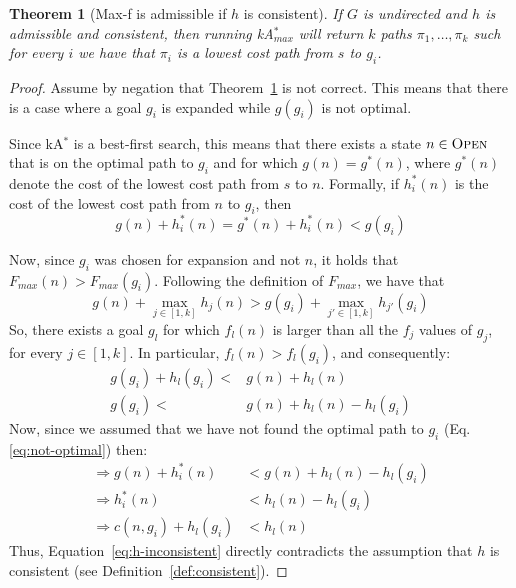 \documentclass{aicom2e}
\newtheorem{theorem}{Theorem}
\newcommand{\kastar}{kA$^*$}
\newcommand{\kastarmax}{kA$^*_{max}$}
\newcommand{\maxf}{Max-f}
\newcommand{\open}{\textsc{Open}}
\begin{document}
 
\begin{theorem}[\maxf{} is admissible if $h$ is consistent]
If $G$ is undirected and $h$ is admissible and consistent, 
then running \kastarmax{} will return $k$ paths $\pi_1,\ldots, \pi_k$ such for every $i$ we have that $\pi_i$ is a lowest cost path from $s$ to $g_i$. 
\label{the:max-f}
\end{theorem}
 \begin{proof}
 Assume by negation that Theorem~\ref{the:max-f} is not correct. This means
 that there is a case where a goal $g_i$ is expanded while $g(g_i)$ is not optimal. 
 
 Since \kastar{} is a best-first search, this means that there exists a state $n\in \open{}$ that is on the optimal path to $g_i$ and for which $g(n)=g^*(n)$, where $g^*(n)$ denote the cost of the lowest cost path from $s$ to $n$. Formally, 
 if $h^*_i(n)$ is the cost of the lowest cost path from $n$ to $g_i$, then
 \begin{equation}
     g(n)+h_i^*(n) = g^*(n)+h_i^*(n) < g(g_i)
    \label{eq:not-optimal}
 \end{equation}
 
 Now, since $g_i$ was chosen for expansion and not $n$, it holds that $F_{max}(n)  > F_{max}(g_i)$. Following the definition of $F_{max}$, we have that
 \begin{equation}
     g(n)+\max_{j\in [1,k]} h_j(n) > g(g_i) + \max_{j'\in [1,k]} h_{j'}(g_i)
 \end{equation}
 So, there exists a goal $g_l$ for which $f_l(n)$ is larger than 
 all the $f_j$ values of $g_j$, for every $j\in [1,k]$. In particular, 
 $f_l(n)>f_l(g_i)$, and consequently:
 \begin{align}
     g(g_i)+h_l(g_i) < & g(n)+h_l(n) \\
     g(g_i) < & g(n)+h_l(n) - h_l(g_i) 
 \end{align} 
Now, since we assumed that we have not found the optimal path to $g_i$ (Eq.~ \ref{eq:not-optimal}) then:
\begin{align}
\Rightarrow g(n)+h^*_i(n)  & < g(n)+h_l(n) - h_l(g_i)\\
\Rightarrow h^*_i(n)  & < h_l(n) - h_l(g_i)\\
\Rightarrow c(n,g_i) + h_l(g_i) & < h_l(n) \label{eq:h-inconsistent} 
\end{align}
Thus, Equation~\ref{eq:h-inconsistent} directly contradicts the assumption
that $h$ is consistent (see Definition~\ref{def:consistent}). 
\end{proof} 
\end{document}
